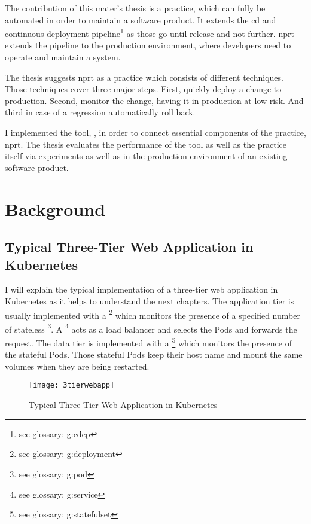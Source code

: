 The contribution of this mater's thesis is a practice, which can fully be automated in
order to maintain a software product. It extends the \gls{cd} and continuous deployment
pipeline\footnote{see glossary: \gls{g:cdep}} as those go until release and not
further. \gls{nprt} extends the pipeline to the production environment, where developers need to
operate and maintain a system.

The thesis suggests \gls{nprt} as a practice which consists of different techniques. Those
techniques cover three major steps. First, quickly deploy a change to production. Second,
monitor the change, having it in production at low risk. And third in case of a regression
automatically roll back.

I implemented the tool, \deployer{}, in order to connect essential components of the
practice, \gls{nprt}. The thesis evaluates the performance of the tool as well as the
practice itself via experiments as well as in the production environment of an existing
software product.

\chapter{Background}
\label{chap:background}

\section{Typical Three-Tier Web Application in Kubernetes}

I will explain the typical implementation of a three-tier web application in Kubernetes as it helps to understand the next chapters. The application tier is usually implemented with a
\footnote{see glossary: \gls{g:deployment}} which
monitors the presence of a specified number of stateless \footnote{see
  glossary: \gls{g:pod}}. A \footnote{see glossary: \gls{g:service}} acts as
a load balancer and selects the Pods and forwards the request. The data tier is
implemented with a \footnote{see glossary: \gls{g:statefulset}} which
monitors the presence of the stateful Pods. Those stateful Pods keep their host name and
mount the same volumes when they are being restarted.

\begin{figure}[htbp]
  \centering
  \texttt{[image: 3tierwebapp]}
  \caption{Typical Three-Tier Web Application in Kubernetes}
  \label{fig:3tierwebapp}
\end{figure}

